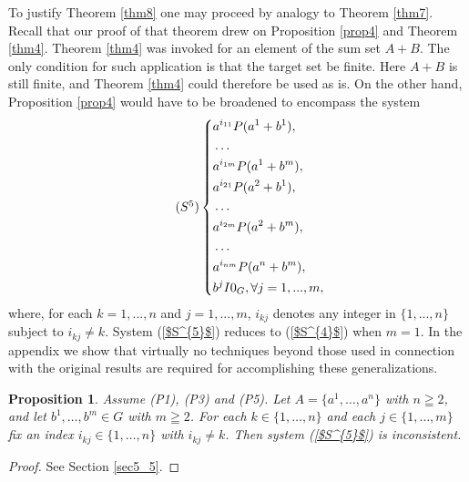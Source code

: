 \documentclass[pdflatex,sn-apa,11pt]{sn-jnl}%
\newtheorem{proposition}{Proposition}%
\begin{document}
To justify Theorem \ref{thm8} one may proceed by analogy to Theorem \ref{thm7}. Recall that our proof of that theorem drew on Proposition \ref{prop4} and Theorem \ref{thm4}. Theorem \ref{thm4} was invoked for an element of the sum set $A+B$. The only condition for such application is that the target set be finite. Here $A+B$ is still finite, and Theorem \ref{thm4} could therefore be used as is. On the other hand, Proposition \ref{prop4} would have to be broadened to encompass the system
\begin{equation}
\tag{$S^{5}$}
\label{$S^{5}$}
  \left\{
    \begin{aligned}
      & a^{i_{11}}P(a^{1} + b^{1}), \\
      & \dots \\
      & a^{i_{1m}}P(a^{1} + b^{m}), \\
      & a^{i_{21}}P(a^{2} + b^{1}), \\
      & \dots \\
      & a^{i_{2m}}P(a^{2} + b^{m}), \\
      & \dots \\
      & a^{i_{nm}}P(a^{n} + b^{m}), \\
      & b^{j}I{0_G}, \forall j = 1, ..., m,\\
    \end{aligned}
  \right.
\end{equation}where, for each $k = 1, ..., n$ and $j = 1, ..., m$, $i_{kj}$ denotes any integer in $\{1, ..., n\}$ subject to $i_{kj} \neq k$. System (\ref{$S^{5}$}) reduces to (\ref{$S^{4}$}) when $m = 1$. %
In the appendix we show that virtually no techniques beyond those used in connection with the original results are required for accomplishing these generalizations.

\begin{proposition}
\label{prop4_gen}
Assume (P1), (P3) and (P5). 
Let $A=\{a^1,\dots,a^n\}$ with $n\geqq 2$, and let $b^1,\dots,b^m \in G$ with $m\geqq 2$. 
For each $k\in\{1,\dots,n\}$ and each $j\in\{1,\dots,m\}$ fix an index $i_{kj}\in\{1,\dots,n\}$ with $i_{kj}\neq k$. Then system (\ref{$S^{5}$}) is inconsistent.
\end{proposition}

\begin{proof}
See Section \ref{sec5_5}.
\end{proof}
\end{document}
